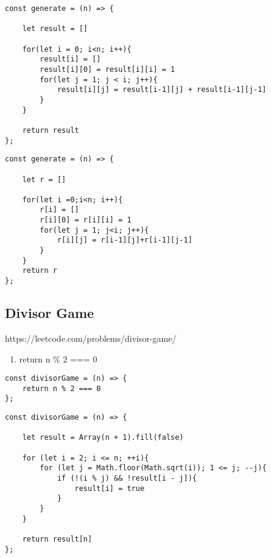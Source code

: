 \documentclass[10pt]{article}
\begin{document}
\begin{lstlisting}[title=Solution generate, captionpos=t]
const generate = (n) => {
    
    let result = []
    
    for(let i = 0; i<n; i++){
        result[i] = []
        result[i][0] = result[i][i] = 1
        for(let j = 1; j < i; j++){
            result[i][j] = result[i-1][j] + result[i-1][j-1]
        }
    }
    
    return result
};
\end{lstlisting}

\begin{lstlisting}[title=Solution generate with less mess, captionpos=t]
const generate = (n) => {
    
    let r = []
    
    for(let i =0;i<n; i++){
        r[i] = []
        r[i][0] = r[i][i] = 1
        for(let j = 1; j<i; j++){
            r[i][j] = r[i-1][j]+r[i-1][j-1]
        }
    }
    return r
};
\end{lstlisting}
\medskip %








\pagebreak %
\medskip   
\subsection{Divisor Game}
https://leetcode.com/problems/divisor-game/

\begin{enumerate}
	\item return n \% 2 === 0 
\end{enumerate}

\begin{lstlisting}[title=Solution divisorGame, captionpos=t]
const divisorGame = (n) => {
    return n % 2 === 0
};
\end{lstlisting}


\begin{lstlisting}[title=Solution divisorGame, captionpos=t]
const divisorGame = (n) => {
    
    let result = Array(n + 1).fill(false)
    
    for (let i = 2; i <= n; ++i){
        for (let j = Math.floor(Math.sqrt(i)); 1 <= j; --j){
            if (!(i % j) && !result[i - j]){
                result[i] = true
            }
        }
    }
   
    return result[n]
};
\end{lstlisting}
\end{document}
